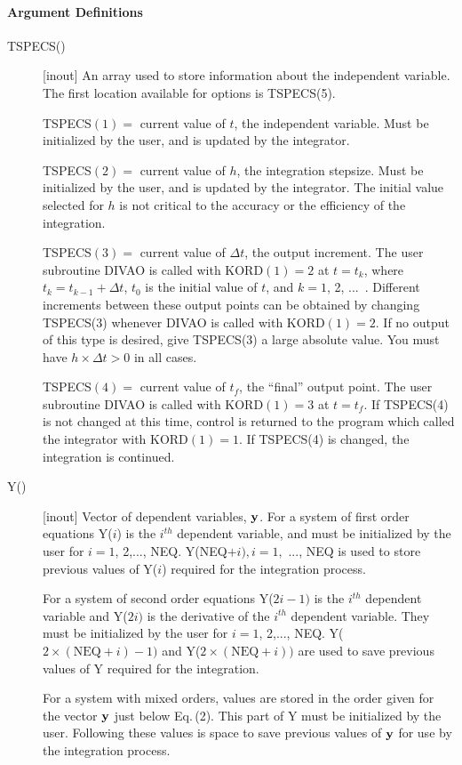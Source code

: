 \documentclass[twoside]{MATH77}
\begin{document}
\paragraph{Argument Definitions\label{ArgDefs}}
\begin{description}
\item[TSPECS()]  [inout] An array used to store information about the
independent variable. The first location available for options is TSPECS(5).

TSPECS$(1)=$ current value of $t$, the independent variable. Must be
initialized by the user, and is updated by the integrator.

TSPECS$(2)=$ current value of $h$, the integration stepsize. Must be
initialized by the user, and is updated by the integrator. The initial value
selected for $h$ is not critical to the accuracy or the efficiency of the
integration.

TSPECS$(3)=$ current value of $\Delta t$, the output increment. The user
subroutine DIVAO is called with KORD$(1)=2$ at $t=t_k$, where $%
t_k=t_{k-1}+\Delta t$, $t_0$ is the initial value of $t$, and $k=1$, 2, ...\
. Different increments between these output points can be obtained by
changing TSPECS(3) whenever DIVAO is called with KORD$(1)=2$. If no output
of this type is desired, give TSPECS(3) a large absolute value. You must
have $h\times \Delta t>0$ in all cases.

TSPECS$(4)=$ current value of $t_f$, the ``final'' output point. The user
subroutine DIVAO is called with KORD$(1)=3$ at $t=t_f$. If TSPECS(4) is not
changed at this time, control is returned to the program which called the
integrator with KORD$(1)=1$. If TSPECS(4) is changed, the integration is
continued.

\item[Y()]  [inout] Vector of dependent variables, ${\bf y}$. For a system
of first order equations Y($i$) is the $i^{th}$ dependent variable, and must
be initialized by the user for $i=1$, 2,..., NEQ. Y(NEQ$+{i}),i=1,$ ..., NEQ
is used to store previous values of Y($i$) required for the integration
process.

For a system of second order equations Y($2{i-1})$ is the $i^{th}$ dependent
variable and Y($2i)$ is the derivative of the $i^{th}$ dependent variable.
They must be initialized by the user for $i=1$, 2,..., NEQ. Y($2\times (%
\text{NEQ}+i)-1)$ and Y($2\times (\text{NEQ}+i))$ are used to
save previous values of Y required for the integration.

For a system with mixed orders, values are stored in the order given for the
vector ${\bf y}$ just below Eq.\,(2). This part of Y must be initialized by
the user. Following these values is space to save previous values
of ${\bf y}$ for use by the integration process.


\end{description}
\end{document}
